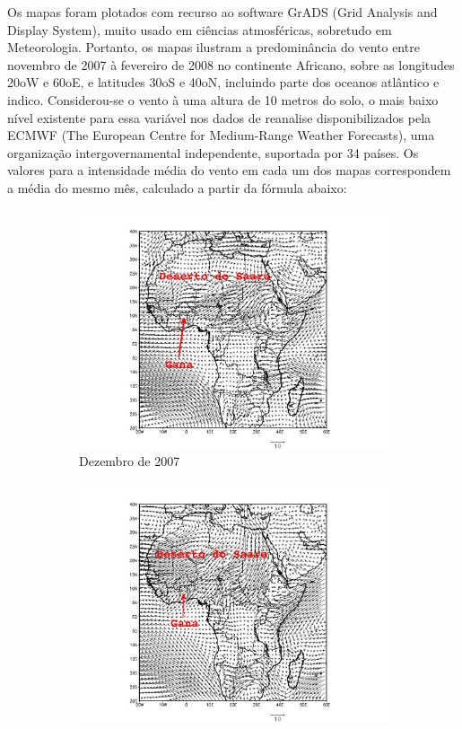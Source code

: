 Os mapas foram plotados com recurso ao software GrADS (Grid Analysis and Display System), muito usado em ciências atmosféricas, sobretudo em Meteorologia. Portanto, os mapas ilustram a predominância do vento entre novembro de 2007 à fevereiro de 2008 no continente Africano, sobre as longitudes 20oW e 60oE, e latitudes 30oS e 40oN, incluindo parte dos oceanos atlântico e indico. Considerou-se o vento à uma altura de 10 metros do solo, o mais baixo nível existente para essa variável nos dados de reanalise disponibilizados pela ECMWF (The European Centre for Medium-Range Weather Forecasts), uma organização intergovernamental independente, suportada por 34 países.
Os valores para a intensidade média do vento em cada um dos mapas correspondem a média do mesmo mês, calculado a partir da fórmula abaixo:

\newpage
\begin{figure}[H]
  \centering
  \begin{subfigure}[b]{0.5\linewidth}
    \includegraphics[width=\linewidth]{../inputs/grads/gimp/875hPa/DEZ_2007.pdf}
    \caption{Dezembro de 2007}
  \end{subfigure}%
  \begin{subfigure}[b]{0.5\linewidth}
    \includegraphics[width=\linewidth]{../inputs/grads/gimp/875hPa/JAN_2008.pdf}

\end{subfigure}
\end{figure}
